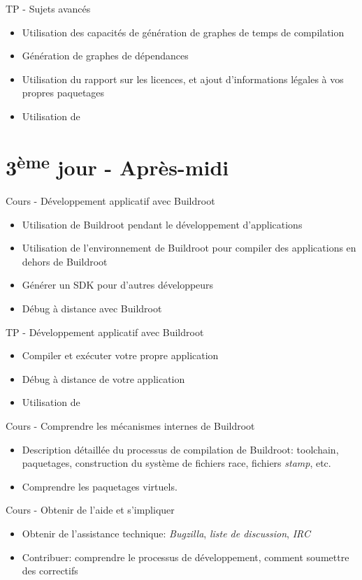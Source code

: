 \documentclass[a4paper,12pt,obeyspaces,spaces,hyphens]{article}
\begin{document}
\feagendaonecolumn
{TP - Sujets avancés}
{
  \begin{itemize}
  \item Utilisation des capacités de génération de graphes de temps de
	compilation
  \item Génération de graphes de dépendances
  \item Utilisation du rapport sur les licences, et ajout d'informations
	légales à vos propres paquetages 
  \item Utilisation de 
  \end{itemize}
}

\section{3\textsuperscript{ème} jour - Après-midi}

\feagendatwocolumn
{Cours - Développement applicatif avec Buildroot}
{
  \begin{itemize}
  \item Utilisation de Buildroot pendant le développement d'applications
  \item Utilisation de l'environnement de Buildroot pour compiler des
	applications en dehors de Buildroot
  \item Générer un SDK pour d'autres développeurs
  \item Débug à distance avec Buildroot
  \end{itemize}
}
{TP - Développement applicatif avec Buildroot}
{
  \begin{itemize}
  \item Compiler et exécuter votre propre application
  \item Débug à distance de votre application
  \item Utilisation de 
  \end{itemize}
}

\feagendatwocolumn
{Cours - Comprendre les mécanismes internes de Buildroot}
{
  \begin{itemize}
  \item Description détaillée du processus de compilation de Buildroot:
    	toolchain, paquetages, construction du système de fichiers race,
	fichiers {\em stamp}, etc.
  \item Comprendre les paquetages virtuels.
  \end{itemize}
}
{Cours - Obtenir de l'aide et s'impliquer}
{
  \begin{itemize}
  \item Obtenir de l'assistance technique: {\em Bugzilla}, {\em liste de
	discussion}, {\em IRC}
  \item Contribuer: comprendre le processus de développement, comment
    soumettre des correctifs
  \end{itemize}
}
\end{document}
